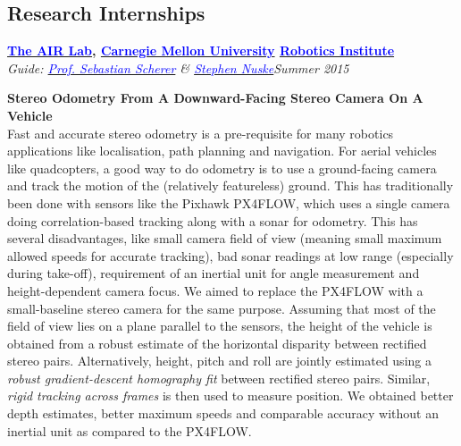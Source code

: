 \documentclass[margin,line]{res}
\newenvironment{list1}{
  \begin{list}{\ding{113}}{%
      \setlength{\itemsep}{0in}
      \setlength{\parsep}{0in} \setlength{\parskip}{0in}
      \setlength{\topsep}{0in} \setlength{\partopsep}{0in} 
      \setlength{\leftmargin}{0.17in}}}{\end{list}}
\begin{document}
\begin{resume}
\section{\sc Research Internships} 

{\bf  \href{http://theairlab.org/}{\textcolor{blue}{The AIR Lab}}, \href{http://www.cmu.edu/}{\textcolor{blue}{Carnegie Mellon University}} \href{http://ri.cmu.edu/}{\textcolor{blue}{Robotics Institute}}} \\
{\em Guide: \href{http://www.ri.cmu.edu/person.html?person_id=1397}{\textcolor{blue}{Prof. Sebastian Scherer}} \& \href{http://www.ri.cmu.edu/person.html?person_id=2128}{\textcolor{blue} {Stephen Nuske}}}\hfill\textit{Summer 2015} \\
\vspace*{-.13in}
\begin{list1}
\item[]\textbf{Stereo Odometry From A Downward-Facing Stereo Camera On A Vehicle} \\
Fast and accurate stereo odometry is a pre-requisite for many robotics applications like localisation, path planning and navigation. For aerial vehicles like quadcopters, a good way to do odometry is to use a ground-facing camera and track the motion of the (relatively featureless) ground. This has traditionally been done with sensors like the Pixhawk PX4FLOW, which uses a single camera doing correlation-based tracking along with a sonar for odometry. This has several disadvantages, like small camera field of view (meaning small maximum allowed speeds for accurate tracking), bad sonar readings at low range (especially during take-off), requirement of an inertial unit for angle measurement and height-dependent camera focus. We aimed to replace the PX4FLOW with a small-baseline stereo camera for the same purpose. Assuming that most of the field of view lies on a plane parallel to the sensors, the height of the vehicle is obtained from a robust estimate of the horizontal disparity between rectified stereo pairs. Alternatively, height, pitch and roll are jointly estimated using a \textit{robust gradient-descent homography fit} between rectified stereo pairs. Similar, \textit{rigid tracking across frames} is then used to measure position. We obtained better depth estimates, better maximum speeds and comparable accuracy without an inertial unit as compared to the PX4FLOW.
\end{list1}


\end{resume}
\end{document}
